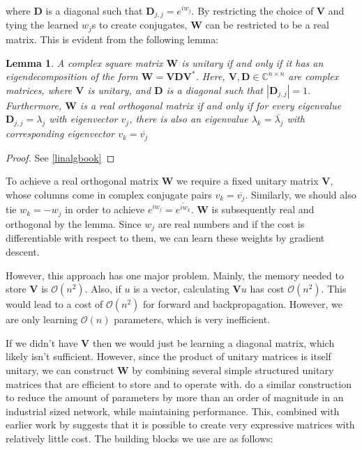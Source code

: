 \documentclass{article} %
\newcommand{\matr}[1]{\mathbf{#1}}
\newtheorem{lemma}{Lemma}
\begin{document}
where $\matr{D}$ is a diagonal such that $\matr{D}_{j,j} = e^{i w_j}$. By restricting the choice of $\matr{V}$ and tying the learned $w_j$s to create conjugates, $\matr{W}$ can be restricted to be a real matrix. This is evident from the following lemma:

\begin{lemma}
  A complex square matrix $\matr{W}$ is unitary if and only if it has an eigendecomposition of the form $\matr{W} = \matr{V} \matr{D} \matr{V}^*$. Here, $\matr{V}, \matr{D} \in \mathbb{C}^{n \times n}$ are complex matrices, where $\matr{V}$ is unitary, and $\matr{D}$ is a diagonal such that $|\matr{D}_{j,j}|=1$. Furthermore, $\matr{W}$ is a real orthogonal matrix if and only if for every eigenvalue $\matr{D}_{j,j} = \lambda_j$ with eigenvector $v_j$, there is also an eigenvalue $\lambda_k = \overline{\lambda_j}$ with corresponding eigenvector $v_k = \overline{v_j}$
\end{lemma}
\begin{proof}
  See \ref{linalgbook}
\end{proof}

To achieve a real orthogonal matrix $\matr{W}$ we require a fixed unitary matrix $\matr{V}$, whose columns come in complex conjugate pairs $v_k = \overline{v_j}$. Similarly, we should also tie $w_k=-w_j$ in order to achieve $e^{i w_j} = \overline{e^{i w_k}}$. $\matr{W}$ is subsequently real and orthogonal by the lemma. Since $w_j$ are real numbers and if the cost is differentiable with respect to them, we can learn these weights by gradient descent. 

However, this approach has one major problem. Mainly, the memory needed to store $\matr{V}$ is $\mathcal{O}\left(n^2\right)$. Also, if $u$ is a vector, calculating $\matr{V}u$ has cost $\mathcal{O}\left( n^2 \right)$. This would lead to a cost of $\mathcal{O} \left( n^2 \right)$ for forward and backpropagation. However, we are only learning $\mathcal{O}(n)$ parameters, which is very inefficient.

If we didn't have $\matr{V}$ then we would just be learning a diagonal matrix, which likely isn't sufficient. However, since the product of unitary matrices is itself unitary, we can construct $\matr{W}$ by combining several simple structured unitary matrices that are efficient to store and to operate with. \cite{dfc} do a similar construction to reduce the amount of parameters by more than an order of magnitude in an industrial sized network, while maintaining performance. This, combined with earlier work by \cite{fastfood} suggests that it is possible to create very expressive matrices with relatively little cost. The building blocks we use are as follows:
\end{document}

